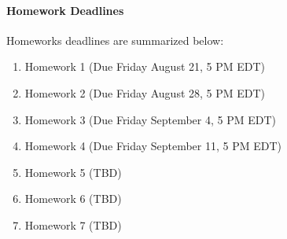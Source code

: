 \documentclass[11pt]{article}
\begin{document}
\paragraph{Homework Deadlines}
Homeworks deadlines are summarized below:

\begin{enumerate}
\item Homework 1 (Due Friday August 21, 5 PM EDT)
\item Homework 2 (Due Friday August 28, 5 PM EDT)
\item Homework 3 (Due Friday September 4, 5 PM EDT)
\item Homework 4 (Due Friday September 11, 5 PM EDT)
\item Homework 5 (TBD)
\item Homework 6 (TBD)
\item Homework 7 (TBD)
\end{enumerate} 
\end{document}
